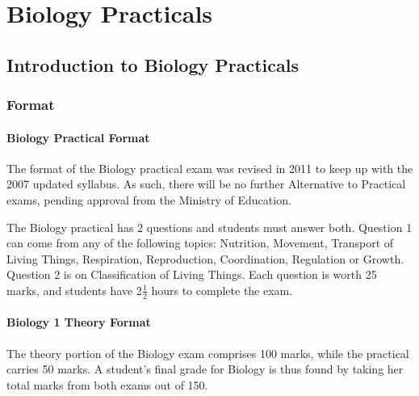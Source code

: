\chapter{Biology Practicals} 

\section{Introduction to Biology Practicals} 

\subsection{Format}

%
%

\subsubsection{Biology Practical Format}

The format of the Biology practical exam was revised in 2011 to keep up with the 2007 updated syllabus. As such, there will be no further Alternative to Practical exams, pending approval from the Ministry of Education.

The Biology practical has 2 questions and students must answer both. Question 1 can come from any of the following topics: Nutrition, Movement, Transport of Living Things, Respiration, Reproduction, Coordination, Regulation or Growth. Question 2 is on Classification of Living Things. Each question is worth 25 marks, and students have 2$\frac{1}{2}$ hours to complete the exam.

\subsubsection{Biology 1 Theory Format}
The theory portion of the Biology exam comprises 100 marks, while the practical carries 50 marks. A student's final grade for Biology is thus found by taking her total marks from both exams out of 150.

